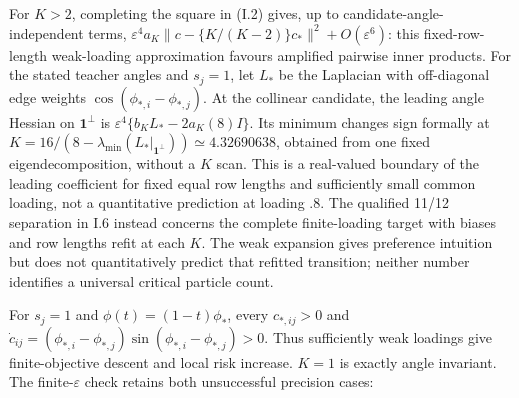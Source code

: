 \documentclass{article}
\begin{document}
For \(K>2\), completing the square in (I.2) gives, up to
candidate-angle-independent terms,
\(\varepsilon^4a_K\|c-\{K/(K-2)\}c_*\|^2+O(\varepsilon^6)\): this
fixed-row-length weak-loading approximation favours amplified pairwise
inner products. For the stated teacher angles and \(s_j=1\), let \(L_*\)
be the Laplacian with off-diagonal edge weights
\(\cos(\phi_{*,i}-\phi_{*,j})\). At the collinear candidate, the leading
angle Hessian on \(\mathbf1^\perp\) is
\(\varepsilon^4\{b_KL_*-2a_K(8)I\}\). Its minimum changes sign formally
at \(K=16/(8-\lambda_{\min}(L_*|_{\mathbf1^\perp}))\simeq4.32690638\),
obtained from one fixed eigendecomposition, without a \(K\) scan. This
is a real-valued boundary of the leading coefficient for fixed equal row
lengths and sufficiently small common loading, not a quantitative
prediction at loading \(.8\). The qualified 11/12 separation in I.6
instead concerns the complete finite-loading target with biases and row
lengths refit at each \(K\). The weak expansion gives preference
intuition but does not quantitatively predict that refitted transition;
neither number identifies a universal critical particle count.

For \(s_j=1\) and \(\phi(t)=(1-t)\phi_*\), every \(c_{*,ij}>0\) and
\(\dot c_{ij}=(\phi_{*,i}-\phi_{*,j})\sin(\phi_{*,i}-\phi_{*,j})>0\).
Thus sufficiently weak loadings give finite-objective descent and local
risk increase. \(K=1\) is exactly angle invariant. The
finite-\(\varepsilon\) check retains both unsuccessful precision cases:
\end{document}
